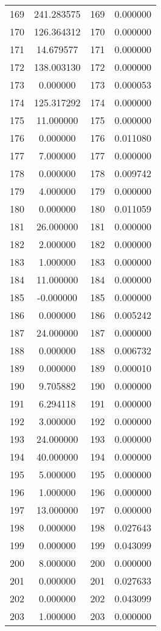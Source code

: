 \documentclass[12pt]{article}
\begin{document}
\begin{longtable}{@{}cccc@{}}
169 & 241.283575 & 169 & 0.000000 \\
170 & 126.364312 & 170 & 0.000000 \\
171 & 14.679577 & 171 & 0.000000 \\
172 & 138.003130 & 172 & 0.000000 \\
173 & 0.000000 & 173 & 0.000053 \\
174 & 125.317292 & 174 & 0.000000 \\
175 & 11.000000 & 175 & 0.000000 \\
176 & 0.000000 & 176 & 0.011080 \\
177 & 7.000000 & 177 & 0.000000 \\
178 & 0.000000 & 178 & 0.009742 \\
179 & 4.000000 & 179 & 0.000000 \\
180 & 0.000000 & 180 & 0.011059 \\
181 & 26.000000 & 181 & 0.000000 \\
182 & 2.000000 & 182 & 0.000000 \\
183 & 1.000000 & 183 & 0.000000 \\
184 & 11.000000 & 184 & 0.000000 \\
185 & -0.000000 & 185 & 0.000000 \\
186 & 0.000000 & 186 & 0.005242 \\
187 & 24.000000 & 187 & 0.000000 \\
188 & 0.000000 & 188 & 0.006732 \\
189 & 0.000000 & 189 & 0.000010 \\
190 & 9.705882 & 190 & 0.000000 \\
191 & 6.294118 & 191 & 0.000000 \\
192 & 3.000000 & 192 & 0.000000 \\
193 & 24.000000 & 193 & 0.000000 \\
194 & 40.000000 & 194 & 0.000000 \\
195 & 5.000000 & 195 & 0.000000 \\
196 & 1.000000 & 196 & 0.000000 \\
197 & 13.000000 & 197 & 0.000000 \\
198 & 0.000000 & 198 & 0.027643 \\
199 & 0.000000 & 199 & 0.043099 \\
200 & 8.000000 & 200 & 0.000000 \\
201 & 0.000000 & 201 & 0.027633 \\
202 & 0.000000 & 202 & 0.043099 \\
203 & 1.000000 & 203 & 0.000000 \\

\end{longtable}
\end{document}
